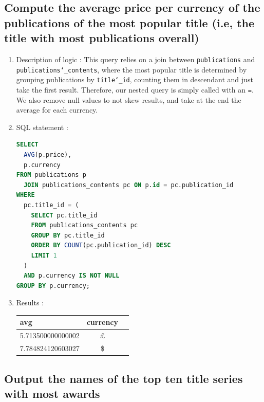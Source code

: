 \documentclass[doubleside, titlepage]{article}
\begin{document}
\subsection{Compute the average price per currency of the publications of the most popular title (i.e, the title with most publications overall)}
	\begin{enumerate}
	\item Description of logic : This query relies on a join between \texttt{publications} and \texttt{publications\char`_contents}, where the most popular title is determined by grouping publications by \texttt{title\char`_id}, counting them in descendant and just take the first result. Therefore, our nested query is simply called with an \texttt{=}. We also remove null values to not skew results, and take at the end the average for each currency.
	\item SQL statement :
		\begin{lstlisting}[language=SQL,showspaces=false,basicstyle=\ttfamily,numberstyle=\tiny,commentstyle=\color{gray}]
SELECT
  AVG(p.price),
  p.currency
FROM publications p
  JOIN publications_contents pc ON p.id = pc.publication_id
WHERE
  pc.title_id = (
    SELECT pc.title_id
    FROM publications_contents pc
    GROUP BY pc.title_id
    ORDER BY COUNT(pc.publication_id) DESC
    LIMIT 1
  )
  AND p.currency IS NOT NULL
GROUP BY p.currency;
		\end{lstlisting}

	\item Results :\\

	\begin{tabular}{|l|c|r|}
  \hline
  avg & currency \\
  \hline
5.713500000000002	& \pounds \\
7.784824120603027	& \$ \\
\hline
\end{tabular}

	\end{enumerate}
	

\subsection{Output the names of the top ten title series with most awards}
\end{document}
